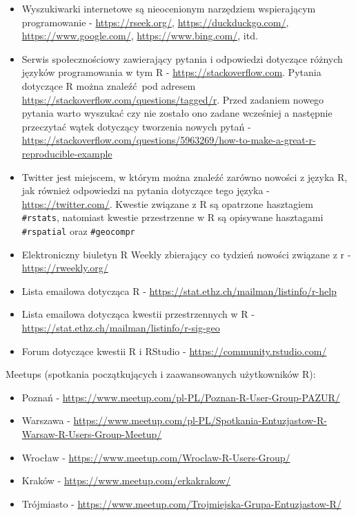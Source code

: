 \documentclass[paper=6in:9in,pagesize=pdftex,headinclude=on,footinclude=on,10pt]{scrbook}
\providecommand{\tightlist}{%
  \setlength{\itemsep}{0pt}\setlength{\parskip}{0pt}}
\begin{document}
\begin{itemize}
\tightlist
\item
  Wyszukiwarki internetowe są nieocenionym narzędziem wspierającym programowanie - \url{https://rseek.org/}, \url{https://duckduckgo.com/}, \url{https://www.google.com/}, \url{https://www.bing.com/}, itd.
\item
  Serwis społecznościowy zawierający pytania i odpowiedzi dotyczące różnych języków programowania w tym R - \url{https://stackoverflow.com}.
  Pytania dotyczące R można znaleźć~pod adresem \url{https://stackoverflow.com/questions/tagged/r}.
  Przed zadaniem nowego pytania warto wyszukać czy nie zostało ono zadane wcześniej a następnie przeczytać wątek dotyczący tworzenia nowych pytań - \url{https://stackoverflow.com/questions/5963269/how-to-make-a-great-r-reproducible-example}
\item
  Twitter jest miejscem, w którym można znaleźć zarówno nowości z języka R, jak również odpowiedzi na pytania dotyczące tego języka - \url{https://twitter.com/}.
  Kwestie związane z R są opatrzone hasztagiem \texttt{\#rstats}, natomiast kwestie przestrzenne w R są opisywane hasztagami \texttt{\#rspatial} oraz \texttt{\#geocompr}
\item
  Elektroniczny biuletyn R Weekly zbierający co tydzień nowości związane z r - \url{https://rweekly.org/}
\item
  Lista emailowa dotycząca R - \url{https://stat.ethz.ch/mailman/listinfo/r-help}
\item
  Lista emailowa dotycząca kwestii przestrzennych w R - \url{https://stat.ethz.ch/mailman/listinfo/r-sig-geo}
\item
  Forum dotyczące kwestii R i RStudio - \url{https://community.rstudio.com/}
\end{itemize}

Meetups (spotkania początkujących i zaawansowanych użytkowników R):

\begin{itemize}
\tightlist
\item
  Poznań - \url{https://www.meetup.com/pl-PL/Poznan-R-User-Group-PAZUR/}
\item
  Warszawa - \url{https://www.meetup.com/pl-PL/Spotkania-Entuzjastow-R-Warsaw-R-Users-Group-Meetup/}
\item
  Wrocław - \url{https://www.meetup.com/Wroclaw-R-Users-Group/}
\item
  Kraków - \url{https://www.meetup.com/erkakrakow/}
\item
  Trójmiasto - \url{https://www.meetup.com/Trojmiejska-Grupa-Entuzjastow-R/}
\end{itemize}
\end{document}
